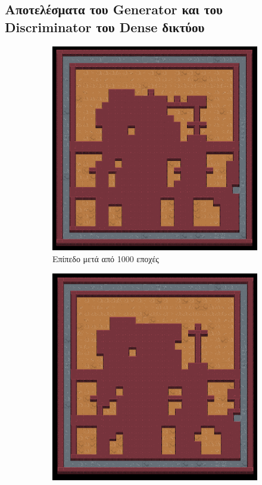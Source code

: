 \subsection{Αποτελέσματα του Generator και του Discriminator του Dense δικτύου}
\begin{figure}[H]
\begin{subfigure}{.5\textwidth}
  \centering
  \includegraphics[width=.8\linewidth]{../images/result_images/dense-gan/generator_1000.png}
  \caption{Επίπεδο μετά από 1000 εποχές}
  \label{fig:sfig1}
\end{subfigure}%
\begin{subfigure}{.5\textwidth}
  \centering
  \includegraphics[width=.8\linewidth]{../images/result_images/dense-gan/generator_3000.png}

\end{subfigure}
\end{figure}

